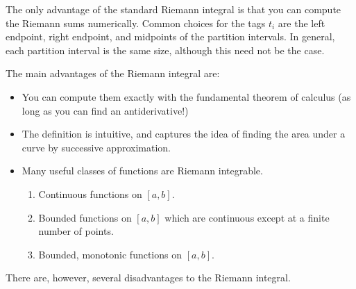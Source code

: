 \documentclass[10pt]{article}         %
\theoremstyle{remark}
\begin{document}
The only advantage of the standard Riemann integral is that you can compute the Riemann sums numerically. Common choices for the tags $t_i$ are the left endpoint, right endpoint, and midpoints of the partition intervals. In general, each partition interval is the same size, although this need not be the case.

The main advantages of the Riemann integral are:
\begin{itemize}
    \item You can compute them exactly with the fundamental theorem of calculus (as long as you can find an antiderivative!)
    \item The definition is intuitive, and captures the idea of finding the area under a curve by successive approximation.
    \item Many useful classes of functions are Riemann integrable.
    \begin{enumerate}
        \item Continuous functions on $[a, b]$.
        \item Bounded functions on $[a, b]$ which are continuous except at a finite number of points.
        \item Bounded, monotonic functions on $[a,b]$.
    \end{enumerate}
\end{itemize}

There are, however, several disadvantages to the Riemann integral.
\end{document}
